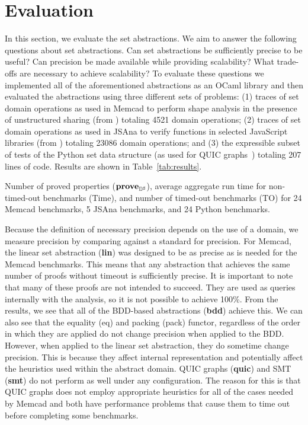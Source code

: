 \section{Evaluation}
\label{sec:evaluation}

In this section, we evaluate the set abstractions.  We aim to answer the following questions about set abstractions. Can set abstractions be sufficiently precise to be useful? Can precision be made available while providing scalability? What trade-offs are necessary to achieve scalability?  To evaluate these questions we implemented all of the aforementioned abstractions as an OCaml library and then evaluated the abstractions using three different sets of problems: (1) traces of set domain operations as used in Memcad to perform shape analysis in the presence of unstructured sharing (from \cite{memcad:15:sas}) totaling 4521 domain operations; (2) traces of set domain operations as used in JSAna to verify functions in selected JavaScript libraries (from \cite{hoo:14:sas,desync:15:esop}) totaling 23086 domain operations; and (3) the expressible subset of tests of the Python set data structure (as used for QUIC graphs~\cite{ab:ecoop:13}) totaling 207 lines of code.  Results are shown in Table~\ref{tab:results}.

\begin{table}[t]
    \caption{Number of proved properties ($\textbf{prove}_{{\mathbb{D}}^{\sharp}}$), average aggregate run time for non-timed-out benchmarks (Time), and number of timed-out benchmarks (TO) for 24 Memcad benchmarks, 5 JSAna benchmarks, and 24 Python benchmarks.}
    \label{tab:results}
    
\end{table}

Because the definition of necessary precision depends on the use of a domain, we measure precision by comparing against a standard for precision.  For Memcad, the linear set abstraction (\textbf{lin}) was designed to be as precise as is needed for the Memcad benchmarks.  This means that any abstraction that achieves the same number of proofs without timeout is sufficiently precise.  It is important to note that many of these proofs are not intended to succeed.  They are used as queries internally with the analysis, so it is not possible to achieve 100\%.  From the results, we see that all of the BDD-based abstractions (\textbf{bdd}) achieve this.  We can also see that the equality (eq) and packing (pack) functor, regardless of the order in which they are applied do not change precision when applied to the BDD.  However, when applied to the linear set abstraction, they do sometime change precision.  This is because they affect internal representation and potentially affect the heuristics used within the abstract domain.  QUIC graphs (\textbf{quic}) and SMT (\textbf{smt}) do not perform as well under any configuration.  The reason for this is that QUIC graphs does not employ appropriate heuristics for all of the cases needed by Memcad and both have performance problems that cause them to time out before completing some benchmarks.

